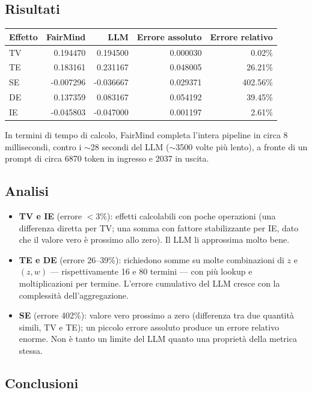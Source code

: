 \subsection*{Risultati}

\begin{center}
\begin{tabular}{lrrrr}
\toprule
Effetto & FairMind & LLM & Errore assoluto & Errore relativo \\
\midrule
TV & 0.194470 & 0.194500 & 0.000030 & 0.02\% \\
TE & 0.183161 & 0.231167 & 0.048005 & 26.21\% \\
SE & -0.007296 & -0.036667 & 0.029371 & 402.56\% \\
DE & 0.137359 & 0.083167 & 0.054192 & 39.45\% \\
IE & -0.045803 & -0.047000 & 0.001197 & 2.61\% \\
\bottomrule
\end{tabular}
\end{center}

In termini di tempo di calcolo, FairMind completa l'intera pipeline in circa 8 millisecondi, contro i \(\sim\)28 secondi del LLM (\(\sim\)3500 volte pi\`u lento), a fronte di un prompt di circa 6870 token in ingresso e 2037 in uscita.

\subsection*{Analisi}

\begin{itemize}
  \item \textbf{TV e IE} (errore $<3\%$): effetti calcolabili con poche operazioni (una differenza diretta per TV; una somma con fattore stabilizzante per IE, dato che il valore vero \`e prossimo allo zero). Il LLM li approssima molto bene.
  \item \textbf{TE e DE} (errore 26--39\%): richiedono somme su molte combinazioni di $z$ e $(z,w)$ --- rispettivamente 16 e 80 termini --- con pi\`u lookup e moltiplicazioni per termine. L'errore cumulativo del LLM cresce con la complessit\`a dell'aggregazione.
  \item \textbf{SE} (errore 402\%): valore vero prossimo a zero (differenza tra due quantit\`a simili, TV e TE); un piccolo errore assoluto produce un errore relativo enorme. Non \`e tanto un limite del LLM quanto una propriet\`a della metrica stessa.
\end{itemize}

\subsection*{Conclusioni}

